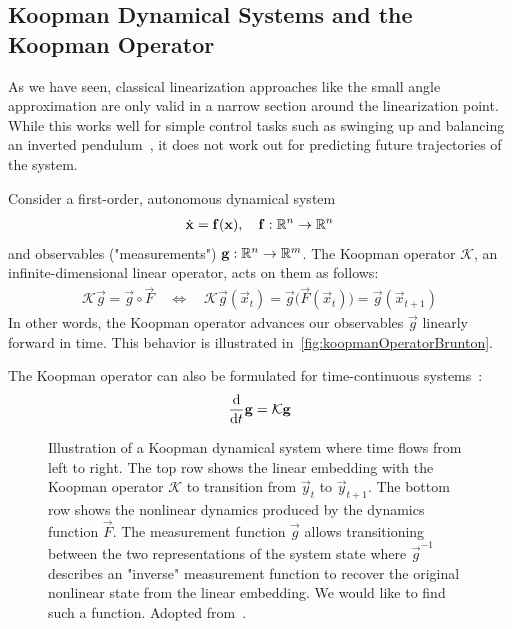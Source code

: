 		\subsection{Koopman Dynamical Systems and the Koopman Operator}
			As we have seen, classical linearization approaches like the small angle approximation are only valid in a narrow section around the linearization point. While this works well for simple control tasks such as swinging up and balancing an inverted pendulum~\cite{bugejaNonlinearSwingupStabilizing2003}, it does not work out for predicting future trajectories of the system. %

			Consider a first-order, autonomous dynamical system
			\begin{align*}
				\dot{\boldsymbol{\mathrm{x}}} = \boldsymbol{\mathrm{f}}(\boldsymbol{\mathrm{x}}),\quad \boldsymbol{\mathrm{f}} : \mathbb{R}^n \to \mathbb{R}^n
			\end{align*}
			and observables ("measurements") \( \boldsymbol{\mathrm{g}} : \mathbb{R}^n \to \mathbb{R}^m \). The Koopman operator \( \mathcal{K} \), an infinite-dimensional linear operator, acts on them as follows:
			\begin{align*}
				\mathcal{K} \vec{g} = \vec{g} \circ \vec{F} \quad\iff\quad \mathcal{K} \vec{g}(\vec{x}_t) = \vec{g}\big(\vec{F}(\vec{x}_t)\big) = \vec{g}(\vec{x}_{t + 1})
			\end{align*}
			In other words, the Koopman operator advances our observables \(\vec{g}\) linearly forward in time. This behavior is illustrated in~\autoref{fig:koopmanOperatorBrunton}.

			The Koopman operator can also be formulated for time-continuous systems~\cite{abrahamManifoldsTensorAnalysis2012}:
			\begin{align*}
				\dv{t} \boldsymbol{\mathrm{g}} = \mathcal{K} \boldsymbol{\mathrm{g}}
			\end{align*}


			\begin{figure}
				\centering
				\tikzKoopmanOperator
				\caption{Illustration of a Koopman dynamical system where time flows from left to right. The top row shows the linear embedding with the Koopman operator \( \mathcal{K} \) to transition from \(\vec{y}_t\) to \(\vec{y}_{t + 1}\). The bottom row shows the nonlinear dynamics produced by the dynamics function \(\vec{F}\). The measurement function \(\vec{g}\) allows transitioning between the two representations of the system state where \(\vec{g}^{-1}\) describes an "inverse" measurement function to recover the original nonlinear state from the linear embedding. We would like to find such a function. Adopted from~\cite{bruntonKoopmanInvariantSubspaces2016}.}
				\label{fig:koopmanOperatorBrunton}
			\end{figure}

